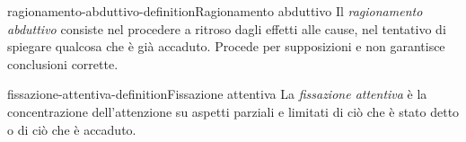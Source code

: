 \documentclass[preview]{standalone}
\begin{document}
\begin{snippetdefinition}{ragionamento-abduttivo-definition}{Ragionamento abduttivo}
    Il \emph{ragionamento abduttivo} consiste nel procedere a ritroso dagli
    effetti alle cause, nel tentativo di spiegare qualcosa che è già accaduto.
    Procede per supposizioni e non garantisce conclusioni corrette.
\end{snippetdefinition}

\begin{snippetdefinition}{fissazione-attentiva-definition}{Fissazione attentiva}
    La \emph{fissazione attentiva} è la concentrazione dell'attenzione su
    aspetti parziali e limitati di ciò che è stato detto o di ciò che è accaduto.
\end{snippetdefinition}

\end{document}
